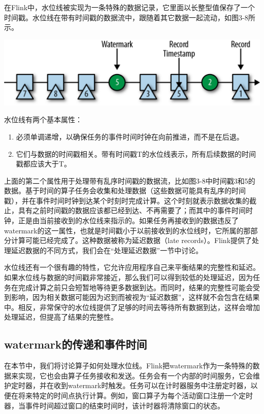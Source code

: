 \documentclass[oneside]{ctexbook}
\begin{document}
在Flink中，水位线被实现为一条特殊的数据记录，它里面以长整型值保存了一个时间戳。水位线在带有时间戳的数据流中，跟随着其它数据一起流动，如图3-8所示。

\noindent \includegraphics[width=\textwidth]{spaf_0308.png}

水位线有两个基本属性：

\begin{enumerate}
  \item 必须单调递增，以确保任务的事件时间时钟在向前推进，而不是在后退。
  \item 它们与数据的时间戳相关。带有时间戳T的水位线表示，所有后续数据的时间戳都应该大于T。
\end{enumerate}

上面的第二个属性用于处理带有乱序时间戳的数据流，比如图3-8中时间戳3和5的数据。基于时间的算子任务会收集和处理数据（这些数据可能具有乱序的时间戳），并在事件时间时钟到达某个时刻时完成计算。这个时刻就表示数据收集的截止，具有之前时间戳的数据应该都已经到达、不再需要了；而其中的事件时间时钟，正是由当前接收到的水位线来指示的。如果任务再接收到的数据违反了watermark的这一属性，也就是时间戳小于以前接收到的水位线时，它所属的那部分计算可能已经完成了。这种数据被称为延迟数据（late records）。Flink提供了处理延迟数据的不同方式，我们会在“处理延迟数据”一节中讨论。

水位线还有一个很有趣的特性，它允许应用程序自己来平衡结果的完整性和延迟。如果水位线与数据的时间戳非常接近，那么我们可以得到较低的处理延迟，因为任务在完成计算之前只会短暂地等待更多数据到达。而同时，结果的完整性可能会受到影响，因为相关数据可能因为迟到而被视为“延迟数据”，这样就不会包含在结果中。相反，非常保守的水位线提供了足够的时间去等待所有数据到达，这样会增加处理延迟，但提高了结果的完整性。

\subsection{watermark的传递和事件时间}

在本节中，我们将讨论算子如何处理水位线。Flink把watermark作为一条特殊的数据来实现，它也会由算子任务接收和发送。任务会有一个内部的时间服务，它会维护定时器，并在收到watermark时触发。任务可以在计时器服务中注册定时器，以便在将来特定的时间点执行计算。例如，窗口算子为每个活动窗口注册一个定时器，当事件时间超过窗口的结束时间时，该计时器将清除窗口的状态。
\end{document}
